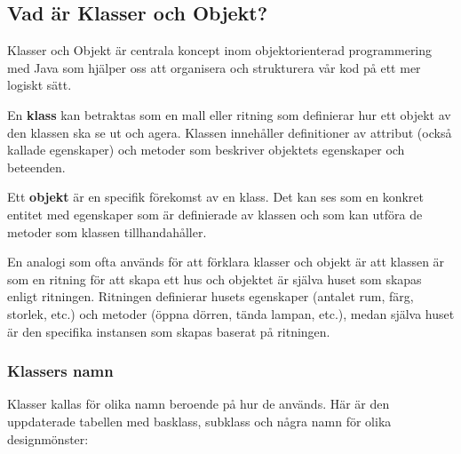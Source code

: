 \hypertarget{vad-uxe4r-klasser-och-objekt}{%
\subsection{Vad är Klasser och
Objekt?}\label{vad-uxe4r-klasser-och-objekt}}

Klasser och Objekt är centrala koncept inom objektorienterad
programmering med Java som hjälper oss att organisera och strukturera
vår kod på ett mer logiskt sätt.

En \textbf{klass} kan betraktas som en mall eller ritning som definierar
hur ett objekt av den klassen ska se ut och agera. Klassen innehåller
definitioner av attribut (också kallade egenskaper) och metoder som
beskriver objektets egenskaper och beteenden.

Ett \textbf{objekt} är en specifik förekomst av en klass. Det kan ses
som en konkret entitet med egenskaper som är definierade av klassen och
som kan utföra de metoder som klassen tillhandahåller.

En analogi som ofta används för att förklara klasser och objekt är att
klassen är som en ritning för att skapa ett hus och objektet är själva
huset som skapas enligt ritningen. Ritningen definierar husets
egenskaper (antalet rum, färg, storlek, etc.) och metoder (öppna dörren,
tända lampan, etc.), medan själva huset är den specifika instansen som
skapas baserat på ritningen.

\hypertarget{klassers-namn}{%
\subsubsection{Klassers namn}\label{klassers-namn}}

Klasser kallas för olika namn beroende på hur de används. Här är den
uppdaterade tabellen med basklass, subklass och några namn för olika
designmönster:

